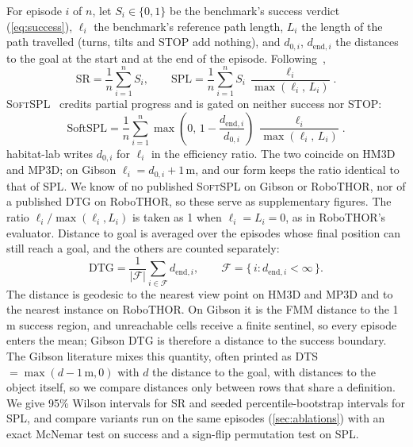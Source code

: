 \documentclass[10pt]{article}
\newcommand{\SR}{\textsc{SR}\xspace}
\newcommand{\SPL}{\textsc{SPL}\xspace}
\newcommand{\SoftSPL}{\textsc{SoftSPL}\xspace}
\newcommand{\DTG}{\textsc{DTG}\xspace}
\begin{document}
For episode $i$ of $n$, let $S_i\in\{0,1\}$ be the benchmark's success verdict (\cref{eq:success}), $\ell_i$ the
benchmark's reference path length, $L_i$ the
length of the path travelled (turns, tilts and STOP add nothing), and $d_{0,i}$, $d_{\mathrm{end},i}$ the distances to
the goal at the start and at the end of the episode. Following~\citet{anderson2018evaluation},
\begin{equation}
  \mathrm{SR} = \frac{1}{n}\sum_{i=1}^{n} S_i,
  \qquad
  \mathrm{SPL} = \frac{1}{n}\sum_{i=1}^{n} S_i\,\frac{\ell_i}{\max(\ell_i,\,L_i)}.
  \label{eq:spl}
\end{equation}
\SoftSPL~\citep{datta2021integrating} credits partial progress and is gated on neither success nor STOP:
\begin{equation}
  \mathrm{SoftSPL} = \frac{1}{n}\sum_{i=1}^{n} \max\!\left(0,\, 1-\frac{d_{\mathrm{end},i}}{d_{0,i}}\right)\,
  \frac{\ell_i}{\max(\ell_i,\,L_i)}.
  \label{eq:softspl}
\end{equation}
habitat-lab writes $d_{0,i}$ for $\ell_i$ in the efficiency ratio. The two coincide on HM3D and MP3D; on Gibson
$\ell_i=d_{0,i}+1$\,m, and our form keeps the ratio identical to that of \SPL. We know of no published \SoftSPL on
Gibson or RoboTHOR, nor of a published \DTG on RoboTHOR, so these serve as supplementary figures. The ratio
$\ell_i/\max(\ell_i,L_i)$ is taken as 1 when $\ell_i=L_i=0$, as in RoboTHOR's evaluator. Distance to goal is averaged
over the episodes whose final position can still reach a goal, and the others are counted separately:
\begin{equation}
  \mathrm{DTG} = \frac{1}{|\mathcal{F}|}\sum_{i\in\mathcal{F}} d_{\mathrm{end},i},
  \qquad \mathcal{F}=\{\,i : d_{\mathrm{end},i}<\infty\,\}.
  \label{eq:dtg}
\end{equation}
The distance is geodesic to the nearest view point on HM3D and MP3D and to the nearest instance on RoboTHOR. On Gibson
it is the FMM distance to the 1\,m success region, and unreachable cells receive a finite sentinel, so every episode
enters the mean; Gibson \DTG is therefore a distance to the success boundary. The Gibson literature mixes this quantity,
often printed as DTS $=\max(d-1\,\mathrm{m},0)$ with $d$ the distance to the goal, with distances to the object itself,
so we compare distances only between rows that share a definition. We give 95\% Wilson intervals for \SR and seeded
percentile-bootstrap intervals for \SPL, and compare variants run on the same episodes (\cref{sec:ablations}) with an
exact McNemar test on success and a sign-flip permutation test on \SPL.
\end{document}
